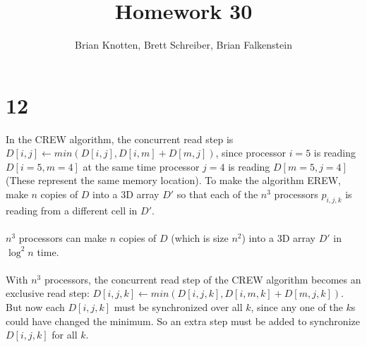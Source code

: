 \documentclass[letterpaper,notitlepage,twoside]{article}
\begin{document}
\title{Homework 30}
\author{Brian Knotten, Brett Schreiber, Brian Falkenstein}
\maketitle

\section*{12}
In the CREW algorithm, the concurrent read step is $D[i,j] \gets min(D[i, j], D[i, m] + D[m, j])$, since processor $i = 5$ is reading $D[i = 5, m = 4]$ at the same time processor $j = 4$ is reading $D[m = 5, j = 4]$ (These represent the same memory location). To make the algorithm EREW, make $n$ copies of $D$ into a 3D array $D'$ so that each of the $n^3$ processors $p_{i, j, k}$ is reading from a different cell in $D'$.
\\\\
$n^3$ processors can make $n$ copies of $D$ (which is size $n^2$) into a 3D array $D'$ in $\log^2 n$ time.
\\\\
With $n^3$ processors, the concurrent read step of the CREW algorithm becomes an exclusive read step: $D[i, j, k] \gets min(D[i, j, k], D[i, m, k] + D[m, j, k])$. But now each $D[i, j, k]$ must be synchronized over all $k$, since any one of the $k$s could have changed the minimum. So an extra step must be added to synchronize $D[i, j, k]$ for all $k$.
\end{document}
